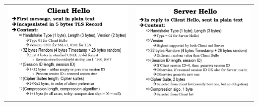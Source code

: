 \documentclass{book}
\theoremstyle{remark}
\begin{document}
\begin{tabular}{cc}
	\includegraphics[scale=0.6]{2021-12-02-15-48-45.png} &
	\includegraphics[scale=0.6]{2021-12-02-15-57-06.png}
\end{tabular}
\end{document}
